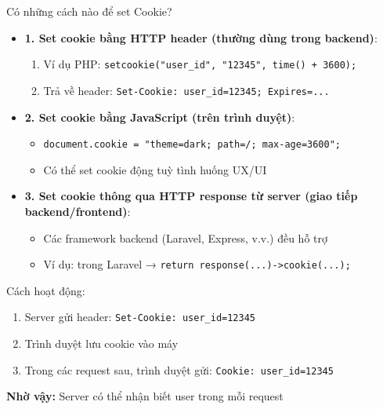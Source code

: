 \documentclass[aspectratio=169]{beamer}
\begin{document}
\begin{frame}{Có những cách nào để set Cookie?}
  \begin{itemize}
    \item \textbf{1. Set cookie bằng HTTP header (thường dùng trong backend)}:
      \begin{enumerate}
        \item Ví dụ PHP: \texttt{setcookie("user\_id", "12345", time() + 3600);}
        \item Trả về header: \texttt{Set-Cookie: user\_id=12345; Expires=...}
      \end{enumerate}

    \item \textbf{2. Set cookie bằng JavaScript (trên trình duyệt)}:
      \begin{itemize}
        \item \texttt{document.cookie = "theme=dark; path=/; max-age=3600";}
        \item Có thể set cookie động tuỳ tình huống UX/UI
      \end{itemize}

    \item \textbf{3. Set cookie thông qua HTTP response từ server (giao tiếp backend/frontend)}:
      \begin{itemize}
        \item Các framework backend (Laravel, Express, v.v.) đều hỗ trợ
        \item Ví dụ: trong Laravel → \texttt{return response(...)->cookie(...);}
      \end{itemize}
  \end{itemize}
\end{frame}

\begin{frame}{Cách hoạt động:}
  \begin{enumerate}
    \item Server gửi header: \texttt{Set-Cookie: user\_id=12345}
    \item Trình duyệt lưu cookie vào máy
    \item Trong các request sau, trình duyệt gửi: \texttt{Cookie: user\_id=12345}
  \end{enumerate}

  \vspace{0.5em}
  \textbf{Nhờ vậy:} Server có thể nhận biết user trong mỗi request
\end{frame}
\end{document}
